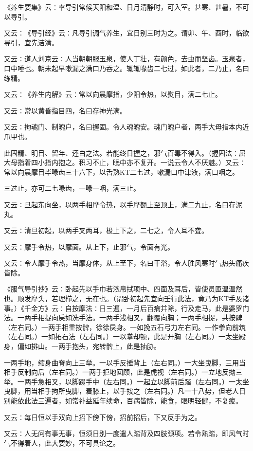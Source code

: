 \documentclass[a4paper,12pt,UTF8,twoside]{ctexbook}
\begin{document}
《养生要集》云∶率导引常候天阳和温、日月清静时，可入室。甚寒、甚暑，不可以导引。

又云∶《导引经》云∶凡导引调气养生，宜日别三时为之。谓卯、午、酉时，临欲导引，宜先洁清。

又云∶道人刘京云∶人当朝朝服玉泉，使人丁壮，有颜色，去虫而坚齿。玉泉者，口中唾也。朝未起早嗽漏之满口乃吞之。辄辄喙齿二七过，如此者，二乃止，名曰练精。

又云∶《养生内解》云∶常以向晨摩指，少阳令热，以熨目，满二七止。

又云∶常以黄昏指目四，名曰存神光满。

又云∶拘魂门、制魄户，名曰握固。令人魂魄安。魂门魄户者，两手大母指本内近爪甲也。

此固精、明目、留年、还白之法。若能终日握之，邪气百毒不得入。（握固法∶屈大母指着四小指内抱之。积习不止，眠中亦不复开。一说云令人不厌魅。）又云∶常以向晨摩目毕喙齿三十六下，以舌熟KT二七过，嗽漏口中津液，满口咽之。

三过止，亦可二七喙齿，一喙一咽，满三止。

又云∶旦起东向坐，以两手相摩令热，以手摩额上至顶上，满二九止，名曰存泥丸。

又云∶清旦初起，以两手叉两耳，极上下之，二七之，令人耳不聋。

又云∶摩手令热，以摩面。从上下，止邪气，令面有光。

又云∶令人摩手令热，当摩身体，从上至下，名曰干浴，令人胜风寒时气热头痛疾皆除。

《服气导引抄》云∶卧起先以手巾若浓帛拭项中、四面及耳后，皆使员匝温温然也。顺发摩头，若理栉之，无在也。（谓卧初起先宜向壬行此法，竟乃为KT手及诸事。）《千金方》云∶自按摩法∶日三遍，一月后百病并除，行及走马，此是婆罗门法。一两手相捉向戾如洗手法。一两手浅相叉，翻覆向胸；一两手相捉，共按髀（左右同。）一两手相重按髀，徐徐戾身。一如挽五石弓力左右同。一作拳向前筑（左右同。）一如拓石法（左右同。）一以拳却顿，此是开胸（左右同。）一太坐殿身，偏如排山。一两手抱头，宛转髀上，此是抽胁。

一两手地，缩身曲脊向上三举。一以手反捶背上（左右同。）一大坐曳脚，三用当相手反制向后（左右同。）一两手拒地回顾，此是虎视（左右同。）一立地反拗三举。一两手急相叉，以脚蹋手中（左右同。）一起立以脚前后踏（左右同。）一太坐曳脚，用当相手拘所曳脚，着膝上，以手按之（左右同。）凡一十八势，但老人日别能依此法三遍者，如常补益延年续命，百病皆除，能食，眼明轻健，不复疲。

又云∶每日恒以手双向上招下傍下傍，招前招后，下又反手为之。

又云∶人无问有事无事，恒须日别一度遣人踏背及四肢颈项。若令熟踏，即风气时气不得着人，此大要妙，不可具论之。
\end{document}
